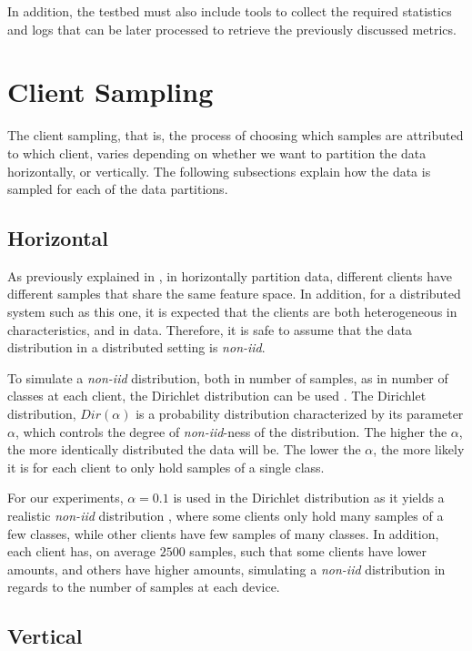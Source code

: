 In addition, the testbed must also include tools to collect the required statistics and logs that can be later processed to retrieve the previously discussed metrics.

\section{Client Sampling}\label{meth:client_sampling}

The client sampling, that is, the process of choosing which samples are attributed to which client, varies depending on whether we want to partition the data horizontally, or vertically. The following subsections explain how the data is sampled for each of the data partitions.

\subsection{Horizontal}

As previously explained in , in horizontally partition data, different clients have different samples that share the same feature space. In addition, for a distributed system such as this one, it is expected that the clients are both heterogeneous in characteristics, and in data. Therefore, it is safe to assume that the data distribution in a distributed setting is \textit{non-iid}.

To simulate a \textit{non-iid} distribution, both in number of samples, as in number of classes at each client, the Dirichlet distribution can be used \cite{tim, 10.48550/arxiv.2006.07242}. The Dirichlet distribution, $Dir(\alpha)$ is a probability distribution characterized by its parameter $\alpha$, which controls the degree of \textit{non-iid}-ness of the distribution. The higher the $\alpha$, the more identically distributed the data will be. The lower the $\alpha$, the more likely it is for each client to only hold samples of a single class.

For our experiments, $\alpha = 0.1$ is used in the Dirichlet distribution as it yields a realistic \textit{non-iid} distribution \cite{10.48550/arxiv.2006.07242}, where some clients only hold many samples of a few classes, while other clients have few samples of many classes. In addition, each client has, on average $2500$ samples, such that some clients have lower amounts, and others have higher amounts, simulating a \textit{non-iid} distribution in regards to the number of samples at each device.

\subsection{Vertical}\label{subsection:verticalpartitioning}

